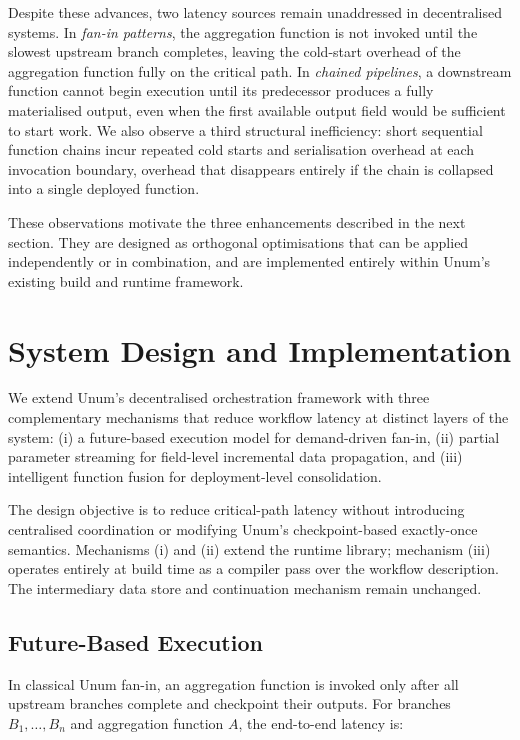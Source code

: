 \documentclass[runningheads]{llncs}
\begin{document}
Despite these advances, two latency sources remain unaddressed in decentralised systems. In \emph{fan-in patterns}, the aggregation function is not invoked until the slowest upstream branch completes, leaving the cold-start overhead of the aggregation function fully on the critical path. In \emph{chained pipelines}, a downstream function cannot begin execution until its predecessor produces a fully materialised output, even when the first available output field would be sufficient to start work. We also observe a third structural inefficiency: short sequential function chains incur repeated cold starts and serialisation overhead at each invocation boundary, overhead that disappears entirely if the chain is collapsed into a single deployed function.

These observations motivate the three enhancements described in the next section. They are designed as orthogonal optimisations that can be applied independently or in combination, and are implemented entirely within Unum's existing build and runtime framework.

\section{System Design and Implementation}
\label{sec:proposed_solution}

We extend Unum's decentralised orchestration framework with three complementary mechanisms that reduce workflow latency at distinct layers of the system: (i) a future-based execution model for demand-driven fan-in, (ii) partial parameter streaming for field-level incremental data propagation, and (iii) intelligent function fusion for deployment-level consolidation.

The design objective is to reduce critical-path latency without introducing centralised coordination or modifying Unum's checkpoint-based exactly-once semantics. Mechanisms (i) and (ii) extend the runtime library; mechanism (iii) operates entirely at build time as a compiler pass over the workflow description. The intermediary data store and continuation mechanism remain unchanged.

\subsection{Future-Based Execution}

In classical Unum fan-in, an aggregation function is invoked only after all upstream branches complete and checkpoint their outputs. For branches $B_1,\dots,B_n$ and aggregation function $A$, the end-to-end latency is:
\end{document}
